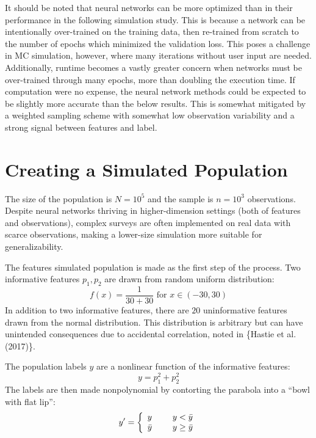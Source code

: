 \documentclass[12pt,twoside]{reedthesis}
\begin{document}
It should be noted that neural networks can be more optimized than in
their performance in the following simulation study. This is because a
network can be intentionally over-trained on the training data, then
re-trained from scratch to the number of epochs which minimized the
validation loss. This poses a challenge in MC simulation, however, where
many iterations without user input are needed. Additionally, runtime
becomes a vastly greater concern when networks must be over-trained
through many epochs, more than doubling the execution time. If
computation were no expense, the neural network methods could be
expected to be slightly more accurate than the below results. This is
somewhat mitigated by a weighted sampling scheme with somewhat low
observation variability and a strong signal between features and label.

\section{Creating a Simulated
Population}\label{creating-a-simulated-population}

The size of the population is \(N=10^5\) and the sample is \(n=10^3\)
observations. Despite neural networks thriving in higher-dimension
settings (both of features and observations), complex surveys are often
implemented on real data with scarce observations, making a lower-size
simulation more suitable for generalizability.

The features simulated population is made as the first step of the
process. Two informative features \(p_1, p_2\) are drawn from random
uniform distribution: \[
f(x) = \frac{1}{30+30} \text{ for } x \in (-30, 30)
\] In addition to two informative features, there are \(20\)
uninformative features drawn from the normal distribution. This
distribution is arbitrary but can have unintended consequences due to
accidental correlation, noted in \{Hastie et al. (2017)\}.

The population labels \(y\) are a nonlinear function of the informative
features: \[
y = p_1^2 + p_2^2
\] The labels are then made nonpolynomial by contorting the parabola
into a ``bowl with flat lip'': \[
y' = \left\{ \begin{array}{cc} 
                y & \hspace{5mm} y<\bar{y} \\
                \bar{y} & \hspace{5mm} y \geq \bar{y} \\
                \end{array} \right.
\]
\end{document}
